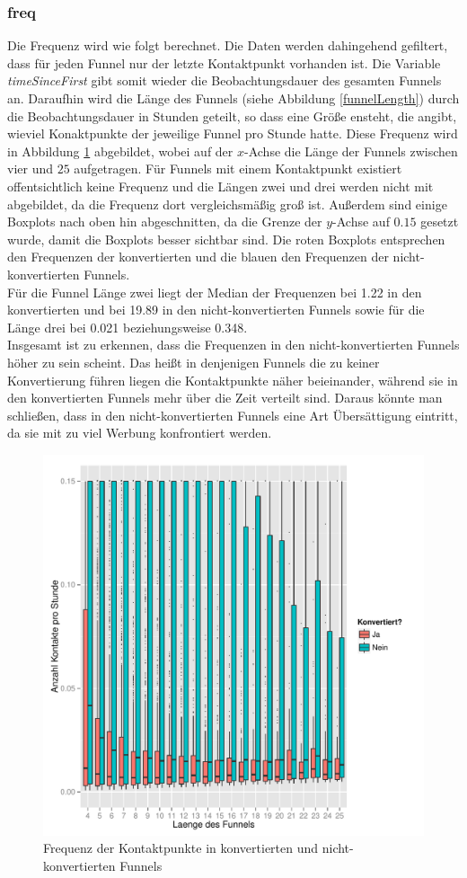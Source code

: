 \subsubsection*{freq}
Die Frequenz wird wie folgt berechnet. Die Daten werden dahingehend gefiltert, dass für jeden Funnel nur der letzte Kontaktpunkt vorhanden ist. Die Variable \textit{timeSinceFirst} gibt somit wieder die Beobachtungsdauer des gesamten Funnels an. Daraufhin wird die Länge des Funnels (siehe Abbildung \ref{funnelLength}) durch die Beobachtungsdauer in Stunden geteilt, so dass eine Größe ensteht, die angibt, wieviel Konaktpunkte der jeweilige Funnel pro Stunde hatte. Diese Frequenz wird in Abbildung \ref{freq} abgebildet, wobei auf der $x$-Achse die Länge der Funnels zwischen vier und $25$ aufgetragen. Für Funnels mit einem Kontaktpunkt existiert offentsichtlich keine Frequenz und die Längen zwei und drei werden nicht mit abgebildet, da die Frequenz dort vergleichsmäßig groß ist. Außerdem sind einige Boxplots nach oben hin abgeschnitten, da die Grenze der $y$-Achse auf $0.15$ gesetzt wurde, damit die Boxplots besser sichtbar sind. Die roten Boxplots entsprechen den Frequenzen der konvertierten und die blauen den Frequenzen der nicht-konvertierten Funnels.\\
Für die Funnel Länge zwei liegt der Median der Frequenzen bei 1.22 in den konvertierten und bei 19.89 in den nicht-konvertierten Funnels sowie für die Länge drei bei 0.021 beziehungsweise 0.348.\\
Insgesamt ist zu erkennen, dass die Frequenzen in den nicht-konvertierten Funnels höher zu sein scheint. Das heißt in denjenigen Funnels die zu keiner Konvertierung führen liegen die Kontaktpunkte näher beieinander, während sie in den konvertierten Funnels mehr über die Zeit verteilt sind. Daraus könnte man schließen, dass in den nicht-konvertierten Funnels eine Art Übersättigung eintritt, da sie mit zu viel Werbung konfrontiert werden.\\
\begin{figure}[H]
		\centering
	\includegraphics[scale=0.5]{freq.pdf}
	\caption{Frequenz der Kontaktpunkte in konvertierten und nicht-konvertierten Funnels}
	\label{freq}
\end{figure}
